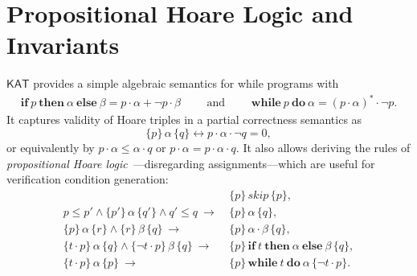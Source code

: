 \documentclass[envcountsame,envcountsect]{llncs}
\newcommand{\IF}[3]{\mathbf{if}\ #1\ \mathbf{then}\ #2\ \mathbf{else}\ #3}
\newcommand{\WHILE}[2]{\mathbf{while}\ #1\ \mathbf{do}\ #2}
\newcommand{\sskip}{\mathit{skip}}
\newcommand{\KAT}{\mathsf{KAT}}
\begin{document}

\section{Propositional Hoare Logic and Invariants}\label{sec:hl-invariants}
$\KAT$ provides a simple algebraic semantics for while
programs with
\begin{align*}
  \IF{p}{\alpha}{\beta} = p\cdot \alpha + \neg p \cdot
  \beta\qquad\text{ and }\qquad
\WHILE{p}{\alpha} = (p\cdot \alpha)^\ast \cdot \neg p.
\end{align*}
It captures validity of Hoare triples in
a partial correctness semantics as
\begin{equation*}
  \{p\}\, \alpha\, \{q\} \leftrightarrow p\cdot\alpha\cdot\neg q = 0,
\end{equation*}
or equivalently by $p\cdot\alpha\le \alpha\cdot q$ or $p\cdot\alpha = p\cdot\alpha\cdot q$. It
also allows deriving the rules of \emph{propositional Hoare
  logic}~\cite{Kozen00}---disregarding assignments---which are useful for
verification condition generation:
\begin{align}
  &\{p\}\, \sskip\, \{p\}, \label{eq:h-skip}\tag{h-skip}\\
  p\le p' \land \{p'\}\, \alpha\, \{q'\} \land q'\le q\ \rightarrow\ &
                                                                       \{p\}\,
                                                                       \alpha\,
                                                                       \{q\},\label{eq:h-cons}\tag{h-cons}\\
  \{p\}\, \alpha\, \{r\} \land \{r\}\, \beta\, \{q\}\ \rightarrow\
  &\{p\}\, \alpha\cdot\beta\, \{q\},\label{eq:h-seq}\tag{h-seq}\\
  \{t\cdot p\}\, \alpha\, \{q\}\land \{\neg t\cdot p\}\, \beta\, \{q\}\
  \rightarrow\ & \{p\}\, \IF{t}{\alpha}{\beta}\, \{q\},\label{eq:h-cond}\tag{h-cond}\\
  \{t\cdot p\}\, \alpha\, \{p\}\ \rightarrow\ & \{p\}\, \WHILE{t}{\alpha}\, \{\neg t\cdot p\}.\label{eq:h-while}\tag{h-while}
\end{align}
\end{document}
